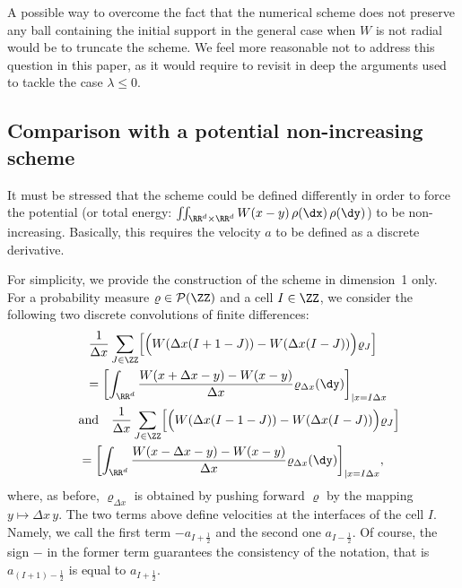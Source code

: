 \begin{rema}
A possible way to overcome the fact that the numerical scheme does not preserve any ball containing the initial support in the general case when $W$ is not radial would be to truncate the scheme. We feel more reasonable not to address this question in this paper, as it would require to revisit in deep the arguments used to tackle the case $\lambda \leq 0$.
\end{rema}


\subsection{Comparison with a potential non-increasing scheme}\label{subse:potential:nonincreasing}

It must be stressed that the scheme could be defined differently in order to force the potential (or total energy: $\iint_{\RR^d \times \RR^d} W(x - y) \, \rho(\dx)\, \rho(\dy)$) to be non-increasing. Basically, this requires the velocity $a$ to be defined as a discrete derivative.

For simplicity, we provide the construction of the scheme in dimension~1 only. For a probability measure $\varrho \in {\mathcal P}(\ZZ)$ and a cell $I \in \ZZ$, we consider the following two discrete convolutions of finite differences:
\begin{multline*}
\frac1{\Delta x}\sum_{J \in \ZZ}
\Bigl[
\Bigl(W(\Delta x (I + 1 - J) ) - W(\Delta x (I - J) )
\Bigr) \varrho_{J}
\Bigr]
\\
\shoveright{= \biggl[\int_{\RR^d} \frac{W(x+\Delta x - y) - W(x-y)}{\Delta x}
\varrho_{\Delta x}(\dy) \biggr]_{\vert x=I \Delta x}}
\\
\shoveleft{\text{and}
\quad \frac1{\Delta x} \sum_{J \in \ZZ}
\Bigl[
\Bigl(W(\Delta x (I -1 - J) ) - W(\Delta x (I - J) )
\Bigr) \varrho_{J}
\Bigr]}
\\
= \biggl[\int_{\RR^d} \frac{W(x-\Delta x - y) - W(x-y)}{\Delta x}
\varrho_{\Delta x}(\dy) \biggr]_{\vert x=I \Delta x},
\end{multline*}
where, as before, $\varrho_{\Delta x}$ is obtained by pushing forward $\varrho$ by the mapping $y \mapsto \Delta x \, y$. The two terms above define velocities at the interfaces of the cell $I$. Namely, we call the first term $-a_{I+\tfrac12}$ and the second one $a_{I-\tfrac12}$. Of course, the sign $-$ in the former term guarantees the consistency of the notation, that is $a_{(I+1)-\tfrac12}$ is equal to $a_{I+\tfrac12}$.

